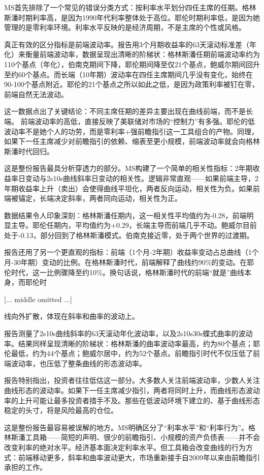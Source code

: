 \documentclass[11pt]{ctexart}
\begin{document}
MS首先排除了一个常见的错误分类方式：按利率水平划分四任主席的任期。格林斯潘时期利率高，是因为1990年代利率整体处于高位。耶伦时期利率低，是因为她管理的是零利率环境。利率水平反映的是经济周期，不是主席的个性或风格。

真正有效的区分指标是前端波动率。报告用3个月期收益率的63天滚动标准差（年化）来衡量前端波动率，数据呈现出清晰的阶梯状：格林斯潘任期前端波动率约为110个基点（年化），伯南克期间下降，耶伦期间降至仅21个基点，鲍威尔期间回升至约60个基点。而长端（10年期）波动率在四任主席期间几乎没有变化，始终在90-100个基点附近。耶伦的21个基点之所以如此之低，是因为政策利率被钉在零，前端自然无法波动。

这一数据点出了关键结论：不同主席任期的差异主要出现在曲线前端，而不是长端。 前端波动率的高低，直接反映了美联储对市场的“控制力”有多强。耶伦的低波动率不是她个人的功劳，而是零利率+强前瞻指引这一工具组合的产物。同理，如果下一任主席减少对前瞻指引的依赖、缩表至更小规模，前端波动率就会向格林斯潘时代回归。

这是整份报告最具分析穿透力的部分。MS构建了一个简单的相关性指标：2年期收益率日变动与2s10s曲线斜率日变动的相关性。逻辑非常直观——如果前端主导，2年期收益率上升（卖出）会使得曲线平坦化，两者反向运动，相关性为负。如果前端被锚定，长端决定斜率，两者同向运动，相关性为正。

数据结果令人印象深刻：格林斯潘任期内，这一相关性平均值约为-0.28，前端明显主导。耶伦任期内，平均值约为+0.29，长端主导而前端几乎不动。鲍威尔目前处于-0.13，部分回到了格林斯潘模式。伯南克接近零，处于两个世界的过渡期。

报告还用了另一个更直观的指标：前端（1个月-2年期）收益率变动占总曲线（1个月-30年期）变动的比例。在格林斯潘时代，前端解释了曲线约90\%的变动。在耶伦时代，这一比例骤降至约10\%。换句话说，格林斯潘时代的前端“就是”曲线本身，而耶伦时

[... middle omitted ...]

线向外扩散，体现在斜率和曲率的波动上。

报告测量了2s10s曲线斜率的63天滚动年化波动率，以及2s10s30s蝶式曲率的波动率。结果同样呈现清晰的阶梯状：格林斯潘的曲率波动率最高，约为80个基点；耶伦最低，约为44个基点；鲍威尔居中，约为52个基点。前瞻指引时代不仅压低了前端波动率，也压低了整条曲线的形态波动率。

报告特别指出，投资者往往低估这一部分。大多数人关注前端波动率，少数人关注曲线形态的波动率。如果下一任主席减少指引，两者将同时上升，而曲线形态波动率的上升可能让最多投资者措手不及。那些在低波动环境下建立的、基于曲线形态稳定的头寸，将是风险最高的仓位。

这是整份报告最容易被误解的地方。MS明确区分了“利率水平”和“利率行为”。格林斯潘工具箱——简短的声明、很少的前瞻指引、小规模的资产负债表——并不会改变利率的绝对水平。经济基本面决定利率水平。但工具箱会改变曲线的行为方式：前端移动更多，斜率和曲率波动更大，市场重新接手自2009年以来由前瞻指引承担的工作。
\end{document}
